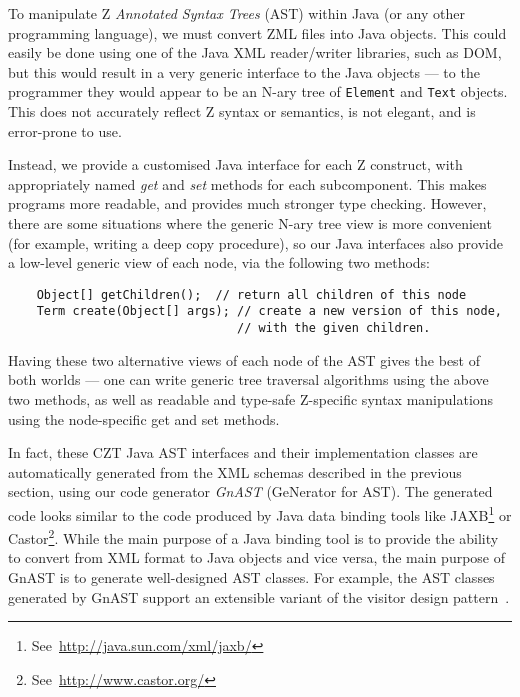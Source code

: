 \documentclass{llncs}
\begin{document}
  To manipulate Z \emph{Annotated Syntax Trees} (AST) within Java (or
  any other programming language), we must convert ZML files into Java
  objects.  This could easily be done using one of the Java XML
  reader/writer libraries, such as DOM, but this would result in a
  very generic interface to the Java objects --- to the programmer they
  would appear to be an N-ary tree of \texttt{Element} and
  \texttt{Text} objects. This does not accurately reflect Z
  syntax or semantics, is not elegant, and is error-prone to use.

  Instead, we provide a customised Java interface for each Z
  construct, with appropriately named \emph{get} and \emph{set}
  methods for each subcomponent.  This makes programs more readable,
  and provides much stronger type checking.  However, there are some
  situations where the generic N-ary tree view is more convenient
  (for example, writing a deep copy procedure), so our Java interfaces
  also provide a low-level generic view of each node, via the following
  two methods:
\begin{small}
\begin{verbatim}
    Object[] getChildren();  // return all children of this node
    Term create(Object[] args); // create a new version of this node,
                                // with the given children.
\end{verbatim}
\end{small}
  Having these two alternative views of each node of the AST gives
  the best of both worlds --- one can write generic tree traversal
  algorithms using the above two methods, as well as readable and
  type-safe Z-specific syntax manipulations using the node-specific
  get and set methods.

  In fact, these CZT Java AST interfaces and their implementation
  classes are automatically generated from the XML schemas described
  in the previous section, using our code generator \emph{GnAST}
  (GeNerator for AST).  The generated code looks similar to the code
  produced by Java data binding tools like
  JAXB\footnote{See~\url{http://java.sun.com/xml/jaxb/}} or
  Castor\footnote{See~\url{http://www.castor.org/}}.
  While the main purpose of a Java binding tool is to
  provide the ability to convert from XML format to Java objects and
  vice versa, the main purpose of GnAST is to generate well-designed
  AST classes.  For example, the AST classes generated by GnAST
  support an extensible variant of the visitor design
  pattern~\cite{GamEA:95,MaiCha:01}.
\end{document}
